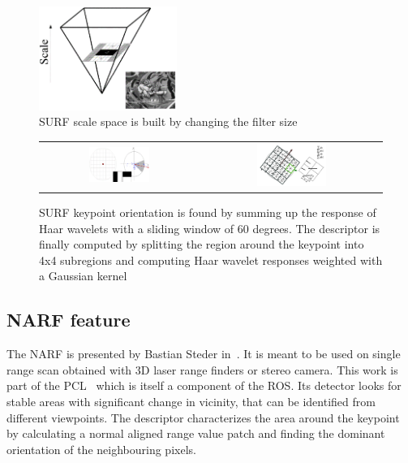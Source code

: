 \begin{figure}[H]
\centering
\includegraphics[width=0.4\textwidth]{figures/surf_scale}
\caption{SURF scale space is built by changing the filter size}
\end{figure}

\begin{figure}[H]
\centering
 \begin{tabular}{cc}
 \includegraphics[width=0.4\textwidth]{figures/surf_orientation} &
 \includegraphics[width=0.4\textwidth]{figures/surf_descriptor}
\end{tabular}
\caption{SURF keypoint orientation is found by summing up the response of Haar wavelets with a sliding window of 60 degrees. The descriptor is finally computed by splitting the region around the keypoint into 4x4 subregions and computing Haar wavelet responses weighted with a Gaussian kernel}
\end{figure}

\subsection{NARF feature}

The \gls{NARF} is presented by Bastian Steder in~\cite{steder10irosws}. It is meant to be used on single range scan obtained with 3D laser range finders or stereo camera. This work is part of the \gls{PCL}~\cite{Rusu_ICRA2011_PCL} which is itself a component of the \gls{ROS}. Its detector looks for stable areas with significant change in vicinity, that can be identified from different viewpoints. The descriptor characterizes the area around the keypoint by calculating a normal aligned range value patch and finding the dominant orientation of the neighbouring pixels.

